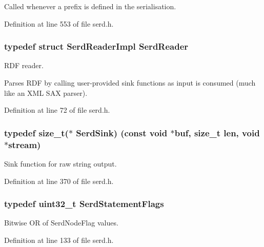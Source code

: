 Called whenever a prefix is defined in the serialisation. 

Definition at line 553 of file serd.\+h.

\subsubsection[{\texorpdfstring{Serd\+Reader}{SerdReader}}]{\setlength{\rightskip}{0pt plus 5cm}typedef struct {\bf Serd\+Reader\+Impl} {\bf Serd\+Reader}}\hypertarget{group__serd_ga69c709eacb062f9e7777726ec80b2796}{}\label{group__serd_ga69c709eacb062f9e7777726ec80b2796}
R\+DF reader.

Parses R\+DF by calling user-\/provided sink functions as input is consumed (much like an X\+ML S\+AX parser). 

Definition at line 72 of file serd.\+h.

\subsubsection[{\texorpdfstring{Serd\+Sink}{SerdSink}}]{\setlength{\rightskip}{0pt plus 5cm}typedef size\+\_\+t($\ast$ Serd\+Sink) ({\bf const} {\bf void} $\ast${\bf buf}, size\+\_\+t {\bf len}, {\bf void} $\ast$stream)}\hypertarget{group__serd_ga84861f1df2f4d3323cb0113dae4ced12}{}\label{group__serd_ga84861f1df2f4d3323cb0113dae4ced12}
Sink function for raw string output. 

Definition at line 370 of file serd.\+h.

\subsubsection[{\texorpdfstring{Serd\+Statement\+Flags}{SerdStatementFlags}}]{\setlength{\rightskip}{0pt plus 5cm}typedef {\bf uint32\+\_\+t} {\bf Serd\+Statement\+Flags}}\hypertarget{group__serd_ga77f5ab7cef4fbc88591eaa9970fcddad}{}\label{group__serd_ga77f5ab7cef4fbc88591eaa9970fcddad}
Bitwise OR of Serd\+Node\+Flag values. 

Definition at line 133 of file serd.\+h.

